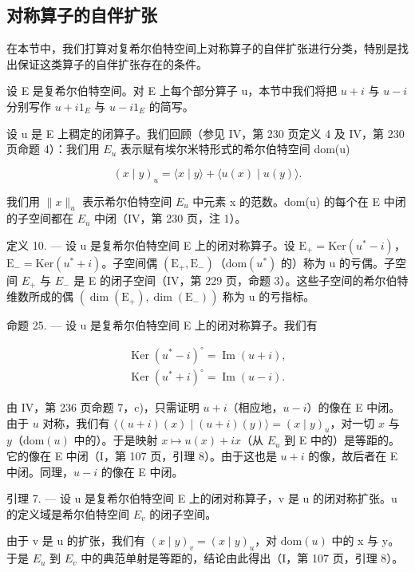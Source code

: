 \subsection{对称算子的自伴扩张}

在本节中，我们打算对复希尔伯特空间上对称算子的自伴扩张进行分类，特别是找出保证这类算子的自伴扩张存在的条件。

设 E 是复希尔伯特空间。对 E 上每个部分算子 u，本节中我们将把 \(u + i\) 与 \(u - i\) 分别写作 \(u + i1_{E}\) 与 \(u - i1_{E}\) 的简写。

设 u 是 E 上稠定的闭算子。我们回顾（参见 IV，第 230 页定义 4 及 IV，第 230 页命题 4）：我们用 \(E_{u}\) 表示赋有埃尔米特形式的希尔伯特空间 dom(u)

\[
(x \mid y) _ {u} = \langle x \mid y \rangle + \langle u (x) \mid u (y) \rangle .
\]

我们用 \(\|x\|_{u}\) 表示希尔伯特空间 \(E_{u}\) 中元素 x 的范数。dom(u) 的每个在 E 中闭的子空间都在 \(E_{u}\) 中闭（IV，第 230 页，注 1）。

定义 10. --- 设 u 是复希尔伯特空间 E 上的闭对称算子。设 \(\mathrm{E}_{+} = \mathrm{Ker}(u^{*} - i)\)，\(\mathrm{E}_{-} = \mathrm{Ker}(u^{*} + i)\)。子空间偶 \((\mathrm{E}_{+}, \mathrm{E}_{-})\)（\(\mathrm{dom}(u^{*})\) 的）称为 u 的亏偶。子空间 \(E_{+}\) 与 \(E_{-}\) 是 E 的闭子空间（IV，第 229 页，命题 3）。这些子空间的希尔伯特维数所成的偶 \((\dim(\mathrm{E}_{+}), \dim(\mathrm{E}_{-}))\) 称为 u 的亏指标。

命题 25. --- 设 u 是复希尔伯特空间 E 上的闭对称算子。我们有

\[
\begin{array}{l} \operatorname{Ker} (u ^ {*} - i) ^ {\circ} = \operatorname{Im} (u + i), \\ \operatorname{Ker} (u ^ {*} + i) ^ {\circ} = \operatorname{Im} (u - i). \end{array}
\]

由 IV，第 236 页命题 7，c)，只需证明 \(u + i\)（相应地，\(u - i\)）的像在 E 中闭。由于 \(u\) 对称，我们有 \(\langle (u + i)(x) \mid (u + i)(y) \rangle = (x \mid y)_u\)，对一切 \(x\) 与 \(y\)（\(\text{dom}(u)\) 中的）。于是映射 \(x \mapsto u(x) + ix\)（从 \(E_u\) 到 E 中的）是等距的。它的像在 E 中闭（I，第 107 页，引理 8）。由于这也是 \(u + i\) 的像，故后者在 E 中闭。同理，\(u - i\) 的像在 E 中闭。

引理 7. --- 设 u 是复希尔伯特空间 E 上的闭对称算子，v 是 u 的闭对称扩张。u 的定义域是希尔伯特空间 \(E_{v}\) 的闭子空间。

由于 v 是 u 的扩张，我们有 \((x \mid y)_{v} = (x \mid y)_{u}\)，对 \(\text{dom}(u)\) 中的 x 与 y。于是 \(E_{u}\) 到 \(E_{v}\) 中的典范单射是等距的，结论由此得出（I，第 107 页，引理 8）。


